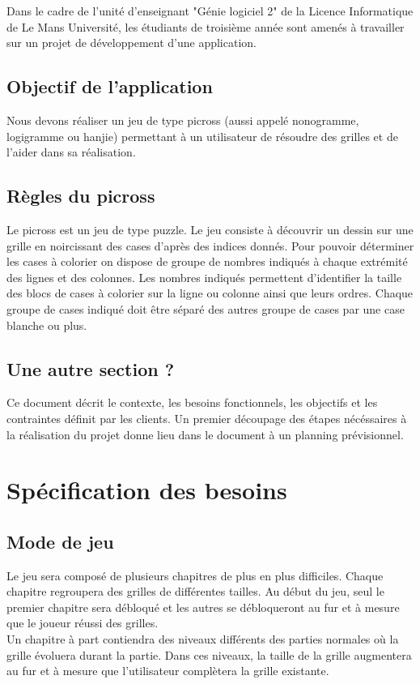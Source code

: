 \documentclass{report}
\begin{document}
		Dans le cadre de l'unité d'enseignant "Génie logiciel 2" de la Licence Informatique de Le Mans Université, les étudiants de troisième année sont amenés à travailler sur un projet de développement d'une application. 
	
  \section{Objectif de l'application}		
		Nous devons réaliser un jeu de type picross (aussi appelé nonogramme, logigramme ou hanjie) permettant à un utilisateur de résoudre des grilles et de l'aider dans sa réalisation.

	\section{Règles du picross}
		Le picross est un jeu de type puzzle. Le jeu consiste à découvrir un dessin sur une grille en noircissant des cases d'après des indices donnés.	
		Pour pouvoir déterminer les cases à colorier on dispose de groupe de nombres indiqués à chaque extrémité des lignes et des colonnes.
		\newline
		Les nombres indiqués permettent d'identifier la taille des blocs de cases à colorier sur la ligne ou colonne ainsi que leurs ordres.
		\newline
		Chaque groupe de cases indiqué doit être séparé des autres groupe de cases par une case blanche ou plus.
		
	\section{Une autre section ?}		
		
		Ce document décrit le contexte, les besoins fonctionnels, les objectifs et les contraintes définit par les clients. Un premier découpage des étapes nécéssaires à la réalisation du projet donne lieu dans le document à un planning prévisionnel.



\chapter{Spécification des besoins}

	\section{Mode de jeu}
			Le jeu sera composé de plusieurs chapitres de plus en plus difficiles. Chaque chapitre regroupera des grilles de différentes tailles. Au début du jeu, seul le premier chapitre sera débloqué et les autres se débloqueront au fur et à mesure que le joueur réussi des grilles.\\
			Un chapitre à part contiendra des niveaux différents des parties normales où la grille évoluera durant la partie. Dans ces niveaux, la taille de la grille augmentera au fur et à mesure que l'utilisateur complètera la grille existante.
\end{document}
